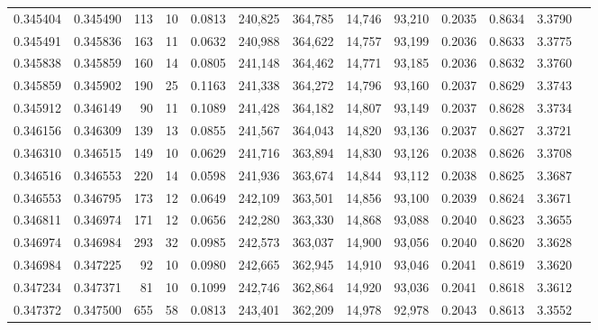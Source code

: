 \begin{tabular}{rrrrrrrrrrrrr}
0.345404 & 0.345490 &   113 &  10 &                                     0.0813 & 240,825 & 364,785 &  14,746 &  93,210 & 0.2035 & 0.8634 & 3.3790 \\
0.345491 & 0.345836 &   163 &  11 &                                     0.0632 & 240,988 & 364,622 &  14,757 &  93,199 & 0.2036 & 0.8633 & 3.3775 \\
0.345838 & 0.345859 &   160 &  14 &                                     0.0805 & 241,148 & 364,462 &  14,771 &  93,185 & 0.2036 & 0.8632 & 3.3760 \\
0.345859 & 0.345902 &   190 &  25 &                                     0.1163 & 241,338 & 364,272 &  14,796 &  93,160 & 0.2037 & 0.8629 & 3.3743 \\
0.345912 & 0.346149 &    90 &  11 &                                     0.1089 & 241,428 & 364,182 &  14,807 &  93,149 & 0.2037 & 0.8628 & 3.3734 \\
0.346156 & 0.346309 &   139 &  13 &                                     0.0855 & 241,567 & 364,043 &  14,820 &  93,136 & 0.2037 & 0.8627 & 3.3721 \\
0.346310 & 0.346515 &   149 &  10 &                                     0.0629 & 241,716 & 363,894 &  14,830 &  93,126 & 0.2038 & 0.8626 & 3.3708 \\
0.346516 & 0.346553 &   220 &  14 &                                     0.0598 & 241,936 & 363,674 &  14,844 &  93,112 & 0.2038 & 0.8625 & 3.3687 \\
0.346553 & 0.346795 &   173 &  12 &                                     0.0649 & 242,109 & 363,501 &  14,856 &  93,100 & 0.2039 & 0.8624 & 3.3671 \\
0.346811 & 0.346974 &   171 &  12 &                                     0.0656 & 242,280 & 363,330 &  14,868 &  93,088 & 0.2040 & 0.8623 & 3.3655 \\
0.346974 & 0.346984 &   293 &  32 &                                     0.0985 & 242,573 & 363,037 &  14,900 &  93,056 & 0.2040 & 0.8620 & 3.3628 \\
0.346984 & 0.347225 &    92 &  10 &                                     0.0980 & 242,665 & 362,945 &  14,910 &  93,046 & 0.2041 & 0.8619 & 3.3620 \\
0.347234 & 0.347371 &    81 &  10 &                                     0.1099 & 242,746 & 362,864 &  14,920 &  93,036 & 0.2041 & 0.8618 & 3.3612 \\
0.347372 & 0.347500 &   655 &  58 &                                     0.0813 & 243,401 & 362,209 &  14,978 &  92,978 & 0.2043 & 0.8613 & 3.3552 \\

\end{tabular}
